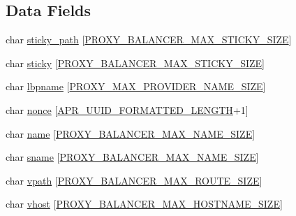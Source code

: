 \subsection*{Data Fields}
\begin{DoxyCompactItemize}
\item 
char \hyperlink{structproxy__balancer__shared_a43e4e46db0e56aae901e99431d0cd3ce}{sticky\+\_\+path} \mbox{[}\hyperlink{group__MOD__PROXY_gaa1431c0055d737cebc5048edfe1e8889}{P\+R\+O\+X\+Y\+\_\+\+B\+A\+L\+A\+N\+C\+E\+R\+\_\+\+M\+A\+X\+\_\+\+S\+T\+I\+C\+K\+Y\+\_\+\+S\+I\+ZE}\mbox{]}
\item 
char \hyperlink{structproxy__balancer__shared_ab4c4a86341df3c258f51e8a828a21501}{sticky} \mbox{[}\hyperlink{group__MOD__PROXY_gaa1431c0055d737cebc5048edfe1e8889}{P\+R\+O\+X\+Y\+\_\+\+B\+A\+L\+A\+N\+C\+E\+R\+\_\+\+M\+A\+X\+\_\+\+S\+T\+I\+C\+K\+Y\+\_\+\+S\+I\+ZE}\mbox{]}
\item 
char \hyperlink{structproxy__balancer__shared_ae91e8fbc2d6d2916f809f3250002cc02}{lbpname} \mbox{[}\hyperlink{group__MOD__PROXY_ga74aeb0c2a68e91a30850950b50baad4e}{P\+R\+O\+X\+Y\+\_\+\+M\+A\+X\+\_\+\+P\+R\+O\+V\+I\+D\+E\+R\+\_\+\+N\+A\+M\+E\+\_\+\+S\+I\+ZE}\mbox{]}
\item 
char \hyperlink{structproxy__balancer__shared_a9b5f2f42006d7062ec566776bd7bba04}{nonce} \mbox{[}\hyperlink{group__APR__UUID_ga295b64f854c9dff02bb0c44e4be917a3}{A\+P\+R\+\_\+\+U\+U\+I\+D\+\_\+\+F\+O\+R\+M\+A\+T\+T\+E\+D\+\_\+\+L\+E\+N\+G\+TH}+1\mbox{]}
\item 
char \hyperlink{structproxy__balancer__shared_add9785d20f633b360dfb06d79c2a29b7}{name} \mbox{[}\hyperlink{group__MOD__PROXY_ga157b5bc40c7ae69c5f7e8df2d813eb71}{P\+R\+O\+X\+Y\+\_\+\+B\+A\+L\+A\+N\+C\+E\+R\+\_\+\+M\+A\+X\+\_\+\+N\+A\+M\+E\+\_\+\+S\+I\+ZE}\mbox{]}
\item 
char \hyperlink{structproxy__balancer__shared_a32c7749ad9d4fe5427aecc4d5744170e}{sname} \mbox{[}\hyperlink{group__MOD__PROXY_ga157b5bc40c7ae69c5f7e8df2d813eb71}{P\+R\+O\+X\+Y\+\_\+\+B\+A\+L\+A\+N\+C\+E\+R\+\_\+\+M\+A\+X\+\_\+\+N\+A\+M\+E\+\_\+\+S\+I\+ZE}\mbox{]}
\item 
char \hyperlink{structproxy__balancer__shared_a7b129997c3d8ae9c884736843fa7dadd}{vpath} \mbox{[}\hyperlink{group__MOD__PROXY_ga2bd0099774c756d192e76a950ad910ae}{P\+R\+O\+X\+Y\+\_\+\+B\+A\+L\+A\+N\+C\+E\+R\+\_\+\+M\+A\+X\+\_\+\+R\+O\+U\+T\+E\+\_\+\+S\+I\+ZE}\mbox{]}
\item 
char \hyperlink{structproxy__balancer__shared_a73faf9f0ffe756037906c3e10a5ca027}{vhost} \mbox{[}\hyperlink{group__MOD__PROXY_ga825d28b2cebd3cf8cfc77494cfcf3a43}{P\+R\+O\+X\+Y\+\_\+\+B\+A\+L\+A\+N\+C\+E\+R\+\_\+\+M\+A\+X\+\_\+\+H\+O\+S\+T\+N\+A\+M\+E\+\_\+\+S\+I\+ZE}\mbox{]}

\end{DoxyCompactItemize}
